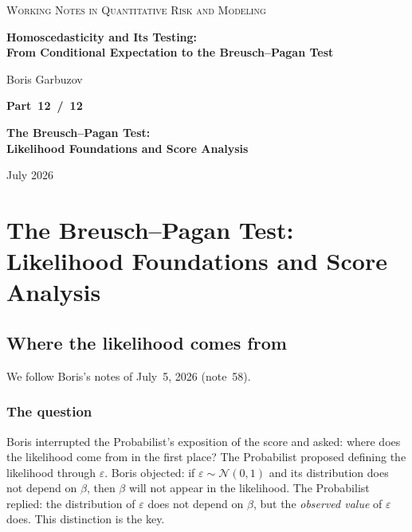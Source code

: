 \documentclass[a4paper,oneside,12pt]{extarticle}
\theoremstyle{plain}
\theoremstyle{definition}
\theoremstyle{remark}
\begin{document}
\begin{titlepage}
\begin{center}

{\footnotesize\scshape\color{gray}
Working Notes in Quantitative Risk and Modeling
}

\vfill

{\LARGE\bfseries Homoscedasticity and Its Testing:\\[4pt]
From Conditional Expectation to the Breusch--Pagan Test}

\vspace{36pt}

{\normalsize Boris Garbuzov}

\vfill

{\Large\bfseries Part~12~/~12}

\vspace{6pt}

{\Large\bfseries The Breusch--Pagan Test:\\Likelihood Foundations and Score Analysis}

\vfill

{\small July 2026}

\end{center}
\end{titlepage}

\setcounter{section}{0}
\setcounter{tocdepth}{2}
\tableofcontents
\newpage

\section{The Breusch--Pagan Test: Likelihood Foundations and Score Analysis}
\label{sec:bp-likelihood}

\subsection{Where the likelihood comes from}
\label{subsec:likelihood}

We follow Boris's notes of July~5, 2026 (note~58).

\subsubsection*{The question}

Boris interrupted the Probabilist's exposition of the score and asked: where
does the likelihood come from in the first place?  The Probabilist proposed
defining the likelihood through $\varepsilon$.  Boris objected:
if $\varepsilon \sim \mathcal{N}(0,1)$ and its distribution does
not depend on $\beta$, then $\beta$ will not appear in the
likelihood.  The Probabilist replied: the distribution of $\varepsilon$ does
not depend on $\beta$, but the \emph{observed value} of $\varepsilon$
does.  This distinction is the key.
\end{document}
